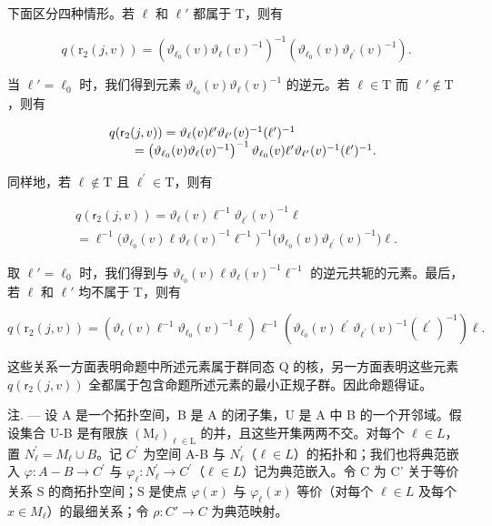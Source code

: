 下面区分四种情形。若 \(\ell\) 和 \(\ell'\) 都属于 T，则有

\[
q \left(\mathrm{r} _ {2} (j, v)\right) = \left. \left(\vartheta_ {\ell_ {0}} (v) \vartheta_ {\ell} (v) ^ {- 1}\right) ^ {- 1} \left(\vartheta_ {\ell_ {0}} (v) \vartheta_ {\ell^ {\prime}} (v) ^ {- 1}\right). \right.
\]

当 \(\ell' = \ell_0\) 时，我们得到元素 \(\vartheta_{\ell_0}(v)\vartheta_\ell(v)^{-1}\) 的逆元。若 \(\ell \in \mathrm{T}\) 而 \(\ell' \notin \mathrm{T}\)，则有

\[
\begin{array}{r l} & q (\mathsf {r} _ {2} (j, v)) = \vartheta_ {\ell} (v) \ell^ {\prime} \vartheta_ {\ell^ {\prime}} (v) ^ {- 1} (\ell^ {\prime}) ^ {- 1} \\ & \qquad = \left(\vartheta_ {\ell_ {0}} (v) \vartheta_ {\ell} (v) ^ {- 1}\right) ^ {- 1} \vartheta_ {\ell_ {0}} (v) \ell^ {\prime} \vartheta_ {\ell^ {\prime}} (v) ^ {- 1} (\ell^ {\prime}) ^ {- 1}. \end{array}
\]

同样地，若 \(\ell\notin\mathrm{T}\) 且 \(\ell^{\prime}\in\mathrm{T}\)，则有

\[
\begin{array}{c} q (\mathsf {r} _ {2} (j, v)) = \vartheta_ {\ell} (v) \ell^ {- 1} \vartheta_ {\ell^ {\prime}} (v) ^ {- 1} \ell \\ = \ell^ {- 1} \bigl (\vartheta_ {\ell_ {0}} (v) \ell \vartheta_ {\ell} (v) ^ {- 1} \ell^ {- 1} \bigr) ^ {- 1} \bigl (\vartheta_ {\ell_ {0}} (v) \vartheta_ {\ell^ {\prime}} (v) ^ {- 1} \bigr) \ell . \end{array}
\]

取 \(\ell' = \ell_0\) 时，我们得到与 \(\vartheta_{\ell_0}(v)\ell\vartheta_\ell(v)^{-1}\ell^{-1}\) 的逆元共轭的元素。最后，若 \(\ell\) 和 \(\ell'\) 均不属于 T，则有

\[
q \left(\mathrm{r} _ {2} (j, v)\right) = \left(\vartheta_ {\ell} (v) \ell^ {- 1} \vartheta_ {\ell_ {0}} (v) ^ {- 1} \ell\right) \ell^ {- 1} \left(\vartheta_ {\ell_ {0}} (v) \ell^ {\prime} \vartheta_ {\ell^ {\prime}} (v) ^ {- 1} \left(\ell^ {\prime}\right) ^ {- 1}\right) \ell .
\]

这些关系一方面表明命题中所述元素属于群同态 Q 的核，另一方面表明这些元素 \(q(\mathsf{r}_{2}(j,v))\) 全都属于包含命题所述元素的最小正规子群。因此命题得证。

注. --- 设 A 是一个拓扑空间，B 是 A 的闭子集，U 是 A 中 B 的一个开邻域。假设集合 U-B 是有限族 \((\mathrm{M}_{\ell})_{\ell\in\mathrm{L}}\) 的并，且这些开集两两不交。对每个 \(\ell\in L\)，置 \(N_{\ell}^{\prime}=M_{\ell}\cup B\)。记 \(C^{\prime}\) 为空间 A-B 与 \(N_{\ell}^{\prime}\)（\(\ell\in L\)）的拓扑和；我们也将典范嵌入 \(\varphi:A-B\to C^{\prime}\) 与 \(\varphi_{\ell}:N_{\ell}^{\prime}\to C^{\prime}\)（\(\ell\in L\)）记为典范嵌入。令 C 为 C' 关于等价关系 S 的商拓扑空间；S 是使点 \(\varphi(x)\) 与 \(\varphi_{\ell}(x)\) 等价（对每个 \(\ell \in L\) 及每个 \(x \in M_{\ell}\)）的最细关系；令 \(\rho: C' \to C\) 为典范映射。

